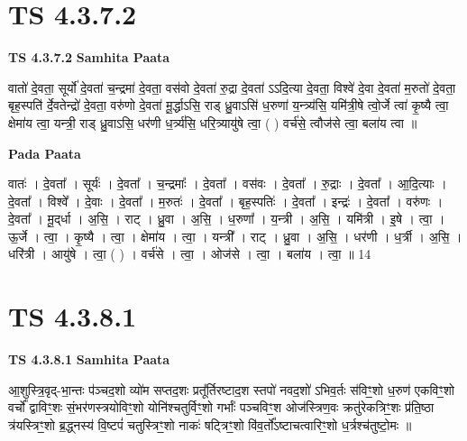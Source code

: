 \documentclass[17pt]{extarticle}
\begin{document}
\section*{ TS 4.3.7.2 }

\textbf{TS 4.3.7.2 } \newline
\textbf{Samhita Paata} \newline

वातो॑ दे॒वता॒ सूर्यो॑ दे॒वता॑ च॒न्द्रमा॑ दे॒वता॒ वस॑वो दे॒वता॑ रु॒द्रा दे॒वता॑ ऽऽदि॒त्या दे॒वता॒ विश्वे॑ दे॒वा दे॒वता॑ म॒रुतो॑ दे॒वता॒ बृह॒स्पति॑ र्दे॒वतेन्द्रो॑ दे॒वता॒ वरु॑णो दे॒वता॑ मू॒र्द्धाऽसि॒ राड् ध्रु॒वाऽसि॑ ध॒रुणा॑ य॒न्त्र्य॑सि॒ यमि॑त्री॒षे त्वो॒र्जे त्वा॑ कृ॒ष्यै त्वा॒ क्षेमा॑य त्वा॒ यन्त्री॒ राड् ध्रु॒वाऽसि॒ धर॑णी ध॒र्त्र्य॑सि॒ धरि॒त्र्यायु॑षे त्वा॒ ( ) वर्च॑से॒ त्वौज॑से त्वा॒ बला॑य त्वा ॥ \newline

\textbf{Pada Paata} \newline

वातः॑ । दे॒वता᳚ । सूर्यः॑ । दे॒वता᳚ । च॒न्द्रमाः᳚ । दे॒वता᳚ । वस॑वः । दे॒वता᳚ । रु॒द्राः । दे॒वता᳚ । आ॒दि॒त्याः । दे॒वता᳚ । विश्वे᳚ । दे॒वाः । दे॒वता᳚ । म॒रुतः॑ । दे॒वता᳚ । बृह॒स्पतिः॑ । दे॒वता᳚ । इन्द्रः॑ । दे॒वता᳚ । वरु॑णः । दे॒वता᳚ । मू॒द्‌र्धा । अ॒सि॒ । राट् । ध्रु॒वा । अ॒सि॒ । ध॒रुणा᳚ । य॒न्त्री । अ॒सि॒ । यमि॑त्री । इ॒षे । त्वा॒ । ऊ॒र्जे । त्वा॒ । कृ॒ष्यै । त्वा॒ । क्षेमा॑य । त्वा॒ । यन्त्री᳚ । राट् । ध्रु॒वा । अ॒सि॒ । धर॑णी । ध॒र्त्री । अ॒सि॒ । धरि॑त्री । आयु॑षे । त्वा॒ ( ) । वर्च॑से । त्वा॒ । ओज॑से । त्वा॒ । बला॑य । त्वा॒ ॥ 14  \newline




\section*{ TS 4.3.8.1 }

\textbf{TS 4.3.8.1 } \newline
\textbf{Samhita Paata} \newline

आ॒शुस्त्रि॒वृद्-भा॒न्तः प॑ञ्चद॒शो व्यो॑म सप्तद॒शः प्रतू᳚र्तिरष्टाद॒श स्तपो॑ नवद॒शो॑ ऽभिव॒र्तः स॑विꣳ॒॒शो ध॒रुण॑ एकविꣳ॒॒शो वर्चो᳚ द्वाविꣳ॒॒शः सं॒भर॑णस्त्रयोविꣳ॒॒शो योनि॑श्चतुर्विꣳ॒॒शो गर्भाः᳚ पञ्चविꣳ॒॒श ओज॑स्त्रिण॒वः क्रतु॑रेकत्रिꣳ॒॒शः प्र॑ति॒ष्ठा त्र॑यस्त्रिꣳ॒॒शो ब्र॒द्ध्नस्य॑ वि॒ष्टपं॑ चतुस्त्रिꣳ॒॒शो नाकः॑ षट्त्रिꣳ॒॒शो वि॑व॒र्तो᳚ऽष्टाचत्वारिꣳ॒॒शो ध॒र्त्रश्च॑तुष्टो॒मः ॥ \newline
\end{document}
